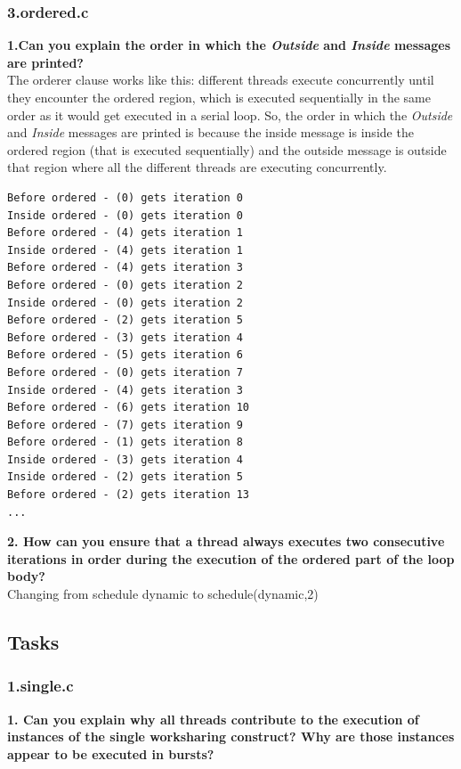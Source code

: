 \documentclass[12]{article}
\begin{document}
\subsubsection{3.ordered.c}
\textbf{1.Can you explain the order in which the \textit{Outside} and \textit{Inside} messages are printed?} 
\\
The orderer clause works like this: different threads execute concurrently until they encounter the ordered region, which is executed sequentially in the same order as it would get executed in a serial loop. So, the order in which the \textit{Outside} and \textit{Inside} messages are printed is because the inside message is inside the ordered region (that is executed sequentially) and the outside message is outside that region where all the different threads are executing concurrently. 
\\
\begin{lstlisting}[frame=single]
Before ordered - (0) gets iteration 0
Inside ordered - (0) gets iteration 0
Before ordered - (4) gets iteration 1
Inside ordered - (4) gets iteration 1
Before ordered - (4) gets iteration 3
Before ordered - (0) gets iteration 2
Inside ordered - (0) gets iteration 2
Before ordered - (2) gets iteration 5
Before ordered - (3) gets iteration 4
Before ordered - (5) gets iteration 6
Before ordered - (0) gets iteration 7
Inside ordered - (4) gets iteration 3
Before ordered - (6) gets iteration 10
Before ordered - (7) gets iteration 9
Before ordered - (1) gets iteration 8
Inside ordered - (3) gets iteration 4
Inside ordered - (2) gets iteration 5
Before ordered - (2) gets iteration 13
...
\end{lstlisting}

\textbf{2. How can you ensure that a thread always executes two consecutive iterations in order during the execution of the ordered part of the loop body?}
\\
Changing from schedule dynamic to schedule(dynamic,2)

\subsection{Tasks}
\subsubsection{1.single.c}
\textbf{1. Can you explain why all threads contribute to the execution of instances of the single worksharing
construct? Why are those instances appear to be executed in bursts?}
\end{document}
